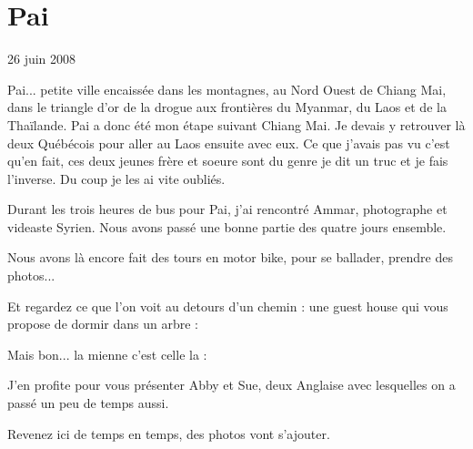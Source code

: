 \section{Pai}

26 juin 2008

\begin{multicols}{2}

Pai... petite ville encaissée dans les montagnes, au Nord Ouest de Chiang Mai, dans le triangle d'or de la drogue aux frontières du Myanmar, du Laos et de la Thaïlande. Pai a donc été mon étape suivant Chiang Mai. Je devais y retrouver là deux Québécois pour aller au Laos ensuite avec eux. Ce que j'avais pas vu c'est qu'en fait, ces deux jeunes frère et soeure sont du genre je dit un truc et je fais l'inverse. Du coup je les ai vite oubliés.

Durant les trois heures de bus pour Pai, j'ai rencontré Ammar, photographe et videaste Syrien. Nous avons passé une bonne partie des quatre jours ensemble.


Nous avons là encore fait des tours en motor bike, pour se ballader, prendre des photos...




Et regardez ce que l'on voit au detours d'un chemin : une guest house qui vous propose de dormir dans un arbre :


Mais bon... la mienne c'est celle la :


J'en profite pour vous présenter Abby et Sue, deux Anglaise avec lesquelles on a passé un peu de temps aussi.

Revenez ici de temps en temps, des photos vont s'ajouter.

\end{multicols}


